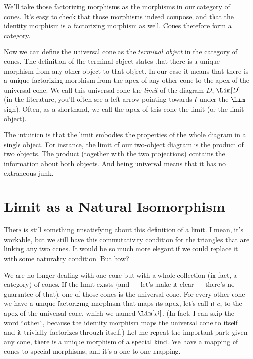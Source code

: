 \noindent
We'll take those factorizing morphisms as the morphisms in our category
of cones. It's easy to check that those morphisms indeed compose, and
that the identity morphism is a factorizing morphism as well. Cones
therefore form a category.

Now we can define the universal cone as the \emph{terminal object} in
the category of cones. The definition of the terminal object states that
there is a unique morphism from any other object to that object. In our
case it means that there is a unique factorizing morphism from the apex
of any other cone to the apex of the universal cone. We call this
universal cone the \emph{limit} of the diagram $D$, $\Lim[D]$ (in
the literature, you'll often see a left arrow pointing towards $I$
under the $\Lim$ sign). Often, as a shorthand, we call the apex of
this cone the limit (or the limit object).

The intuition is that the limit embodies the properties of the whole
diagram in a single object. For instance, the limit of our two-object
diagram is the product of two objects. The product (together with the
two projections) contains the information about both objects. And being
universal means that it has no extraneous junk.

\section{Limit as a Natural Isomorphism}\label{limit-as-a-natural-isomorphism}

There is still something unsatisfying about this definition of a limit.
I mean, it's workable, but we still have this commutativity condition
for the triangles that are linking any two cones. It would be so much
more elegant if we could replace it with some naturality condition. But
how?

We are no longer dealing with one cone but with a whole collection (in
fact, a category) of cones. If the limit exists (and --- let's make it
clear --- there's no guarantee of that), one of those cones is the
universal cone. For every other cone we have a unique factorizing
morphism that maps its apex, let's call it $c$, to the apex of
the universal cone, which we named $\Lim[D]$. (In fact, I can skip
the word ``other'', because the identity morphism maps the universal
cone to itself and it trivially factorizes through itself.) Let me
repeat the important part: given any cone, there is a unique morphism of
a special kind. We have a mapping of cones to special morphisms, and
it's a one-to-one mapping.

